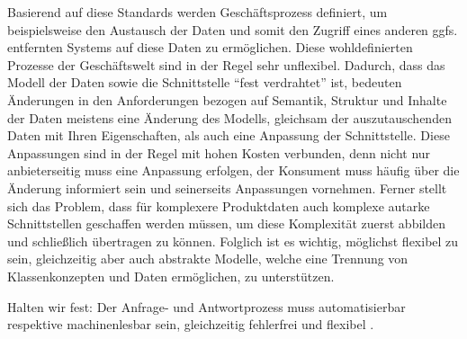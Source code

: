 Basierend auf diese Standards werden Geschäftsprozess definiert, um beispielsweise den Austausch der Daten und somit den Zugriff eines anderen ggfs. entfernten Systems auf diese Daten zu ermöglichen. Diese wohldefinierten Prozesse  der Geschäftswelt sind in der Regel sehr unflexibel. Dadurch, dass das Modell der Daten sowie die Schnittstelle \enquote{fest verdrahtet} ist, bedeuten Änderungen in den Anforderungen bezogen auf Semantik, Struktur und Inhalte der Daten meistens eine Änderung des Modells, gleichsam der auszutauschenden Daten mit Ihren Eigenschaften, als auch eine Anpassung der Schnittstelle. Diese Anpassungen sind in der Regel mit hohen Kosten verbunden, denn nicht nur anbieterseitig muss eine Anpassung erfolgen, der Konsument muss häufig über die Änderung informiert sein und seinerseits Anpassungen vornehmen. 
Ferner stellt sich das Problem, dass für komplexere Produktdaten auch komplexe autarke Schnittstellen geschaffen werden müssen, um diese Komplexität zuerst abbilden und schließlich übertragen zu können.  
Folglich ist es wichtig, möglichst flexibel zu sein, gleichzeitig aber auch abstrakte Modelle, welche eine Trennung von Klassenkonzepten und Daten ermöglichen, zu unterstützen. 

Halten wir fest: Der Anfrage- und Antwortprozess muss automatisierbar respektive machinenlesbar sein, gleichzeitig fehlerfrei und flexibel \citep[vgl.][]{uiterwykEclass}.



